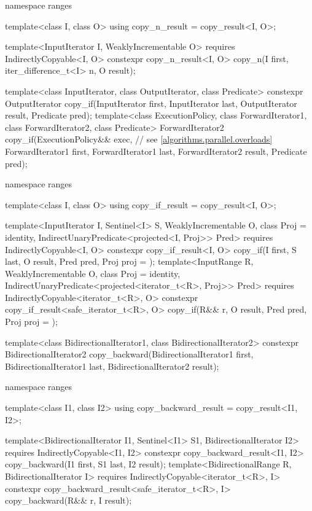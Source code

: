 \begin{codeblock}
{  namespace ranges {
    template<class I, class O>
    using copy_n_result = copy_result<I, O>;

    template<InputIterator I, WeaklyIncrementable O>
      requires IndirectlyCopyable<I, O>
      constexpr copy_n_result<I, O>
        copy_n(I first, iter_difference_t<I> n, O result);
  }

  template<class InputIterator, class OutputIterator, class Predicate>
    constexpr OutputIterator copy_if(InputIterator first, InputIterator last,
                                     OutputIterator result, Predicate pred);
  template<class ExecutionPolicy, class ForwardIterator1, class ForwardIterator2,
           class Predicate>
    ForwardIterator2 copy_if(ExecutionPolicy&& exec, // see \ref{algorithms.parallel.overloads}
                             ForwardIterator1 first, ForwardIterator1 last,
                             ForwardIterator2 result, Predicate pred);

  namespace ranges {
    template<class I, class O>
    using copy_if_result = copy_result<I, O>;

    template<InputIterator I, Sentinel<I> S, WeaklyIncrementable O, class Proj = identity,
        IndirectUnaryPredicate<projected<I, Proj>> Pred>
      requires IndirectlyCopyable<I, O>
      constexpr copy_if_result<I, O>
        copy_if(I first, S last, O result, Pred pred, Proj proj = {});
    template<InputRange R, WeaklyIncrementable O, class Proj = identity,
        IndirectUnaryPredicate<projected<iterator_t<R>, Proj>> Pred>
      requires IndirectlyCopyable<iterator_t<R>, O>
      constexpr copy_if_result<safe_iterator_t<R>, O>
        copy_if(R&& r, O result, Pred pred, Proj proj = {});
  }

  template<class BidirectionalIterator1, class BidirectionalIterator2>
    constexpr BidirectionalIterator2
      copy_backward(BidirectionalIterator1 first, BidirectionalIterator1 last,
                    BidirectionalIterator2 result);

  namespace ranges {
    template<class I1, class I2>
    using copy_backward_result = copy_result<I1, I2>;

    template<BidirectionalIterator I1, Sentinel<I1> S1, BidirectionalIterator I2>
      requires IndirectlyCopyable<I1, I2>
      constexpr copy_backward_result<I1, I2>
        copy_backward(I1 first, S1 last, I2 result);
    template<BidirectionalRange R, BidirectionalIterator I>
      requires IndirectlyCopyable<iterator_t<R>, I>
      constexpr copy_backward_result<safe_iterator_t<R>, I>
        copy_backward(R&& r, I result);
  }

}
\end{codeblock}
